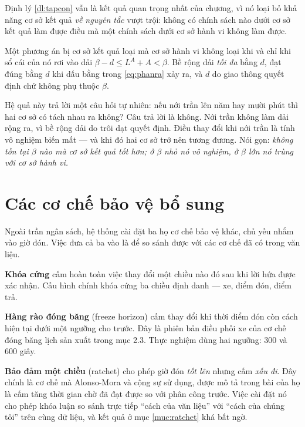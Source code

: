 Định lý \ref{dl:tapcon} vẫn là kết quả quan trọng nhất của chương, vì nó loại bỏ khả năng cơ sở
kết quả \emph{về nguyên tắc} vượt trội: không có chính sách nào dưới cơ sở kết quả làm được điều
mà một chính sách dưới cơ sở hành vi không làm được.

\begin{hequa}
Một phương án bị cơ sở kết quả loại mà cơ sở hành vi không loại khi và chỉ khi sổ cái của nó
rơi vào dải $\beta - d \le L^{A} + A < \beta$. Bề rộng dải \emph{tối đa} bằng $d$, đạt đúng
bằng $d$ khi dấu bằng trong \eqref{eq:phanra} xảy ra, và $d$ do giao thông quyết định chứ không
phụ thuộc $\beta$.
\end{hequa}

Hệ quả này trả lời một câu hỏi tự nhiên: nếu nới trần lên năm hay mười phút thì hai cơ sở có
tách nhau ra không? Câu trả lời là không. Nới trần không làm dải rộng ra, vì bề rộng dải do trôi
dạt quyết định. Điều thay đổi khi nới trần là tính vô nghiệm biến mất --- và khi đó hai cơ sở
trở nên tương đương. Nói gọn: \emph{không tồn tại $\beta$ nào mà cơ sở kết quả tốt hơn; ở
$\beta$ nhỏ nó vô nghiệm, ở $\beta$ lớn nó trùng với cơ sở hành vi.}

\section{Các cơ chế bảo vệ bổ sung}

Ngoài trần ngân sách, hệ thống cài đặt ba họ cơ chế bảo vệ khác, chủ yếu nhắm vào giờ đón. Việc
đưa cả ba vào là để so sánh được với các cơ chế đã có trong văn liệu.

\textbf{Khóa cứng} cấm hoàn toàn việc thay đổi một chiều nào đó sau khi lời hứa được xác nhận.
Cấu hình chính khóa cứng ba chiều định danh --- xe, điểm đón, điểm trả.

\textbf{Hàng rào đóng băng} (freeze horizon) cấm thay đổi khi thời điểm đón còn cách hiện tại
dưới một ngưỡng cho trước. Đây là phiên bản điều phối xe của cơ chế đóng băng lịch sản xuất
trong mục 2.3. Thực nghiệm dùng hai ngưỡng: 300 và 600 giây.

\textbf{Bảo đảm một chiều} (ratchet) cho phép giờ đón \emph{tốt lên} nhưng cấm \emph{xấu đi}.
Đây chính là cơ chế mà Alonso-Mora và cộng sự \cite{alonsomora2017} sử dụng, được mô tả trong
bài của họ là cấm tăng thời gian chờ đã đạt được so với phân công trước. Việc cài đặt nó cho
phép khóa luận so sánh trực tiếp ``cách của văn liệu'' với ``cách của chúng tôi'' trên cùng dữ
liệu, và kết quả ở mục \ref{muc:ratchet} khá bất ngờ.

